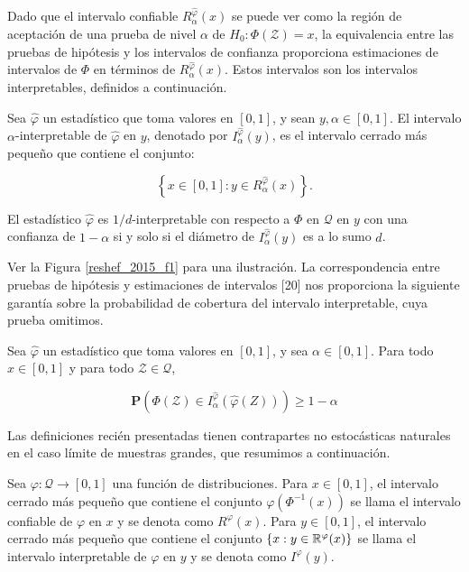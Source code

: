 	Dado que el intervalo confiable $R_\alpha^{\hat{\varphi}}(x)$ se puede ver como la regi\'on de aceptaci\'on de una prueba de nivel $\alpha$ de $H_0: \Phi(\mathcal{Z})=x$, la equivalencia entre las pruebas de hip\'otesis y los intervalos de confianza proporciona estimaciones de intervalos de $\Phi$ en t\'erminos de $R_\alpha^{\hat{\varphi}}(x)$. Estos intervalos son los intervalos interpretables, definidos a continuaci\'on.

	\begin{defn}
		Sea $\hat{\varphi}$ un estad\'istico que toma valores en $[0,1]$, y sean $y, \alpha \in [0,1]$. El intervalo $\alpha$-interpretable de $\hat{\varphi}$ en $y$, denotado por $I_\alpha^{\hat{\varphi}}(y)$, es el intervalo cerrado m\'as peque\~no que contiene el conjunto:

		$$
		\left\{x \in[0,1]: y \in R_\alpha^{\hat{\varphi}}(x)\right\} .
		$$

		El estad\'istico $\hat{\varphi}$ es $1/d$-interpretable con respecto a $\Phi$ en $\mathcal{Q}$ en $y$ con una confianza de $1-\alpha$ si y solo si el di\'ametro de $I_\alpha^{\hat{\varphi}}(y)$ es a lo sumo $d$.
		\label{interpretabilidad}
	\end{defn}

	Ver la Figura \ref{reshef_2015_f1} para una ilustraci\'on. La correspondencia entre pruebas de hip\'otesis y estimaciones de intervalos [20] nos proporciona la siguiente garant\'ia sobre la probabilidad de cobertura del intervalo interpretable, cuya prueba omitimos.

	\begin{prop}
		Sea $\hat{\varphi}$ un estad\'istico que toma valores en $[0,1]$, y sea $\alpha \in [0,1]$. Para todo $x \in [0,1]$ y para todo $\mathcal{Z} \in \mathcal{Q}$,

		$$
		\mathbf{P}\left(\Phi(\mathcal{Z}) \in I_\alpha^{\hat{\varphi}}(\hat{\varphi}(Z))\right) \geq 1-\alpha
		$$
	\end{prop}

	Las definiciones reci\'en presentadas tienen contrapartes no estoc\'asticas naturales en el caso l\'imite de muestras grandes, que resumimos a continuaci\'on.

	\begin{defn}
		Sea $\varphi:\mathcal{Q} \rightarrow [0,1]$ una funci\'on de distribuciones. Para $x \in [0,1]$, el intervalo cerrado m\'as peque\~no que contiene el conjunto $\varphi\left(\Phi^{-1}({x})\right)$ se llama el intervalo confiable de $\varphi$ en $x$ y se denota como $R^{\varphi}(x)$. Para $y \in [0,1]$, el intervalo cerrado m\'as peque\~no que contiene el conjunto $\left\{ x: y \in \mathbb{R}^{\varphi} (x) \right\}$ se llama el intervalo interpretable de $\varphi$ en $y$ y se denota como $I^{\varphi}(y)$.

	\end{defn}

